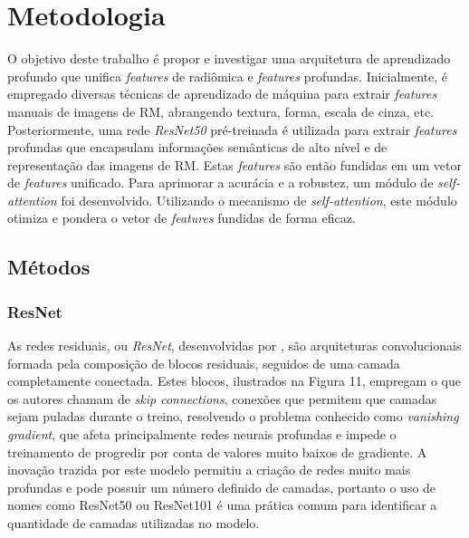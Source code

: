 \chapter{Metodologia} 
\label{chap:metodologia}

O objetivo deste trabalho é propor e investigar uma arquitetura de aprendizado profundo que unifica \textit{features} de radiômica e \textit{features} profundas. Inicialmente, é empregado diversas técnicas de aprendizado de máquina para extrair \textit{features} manuais de imagens de RM, abrangendo textura, forma, escala de cinza, etc. Posteriormente, uma rede \textit{ResNet50} pré-treinada é utilizada para extrair \textit{features} profundas que encapsulam informações semânticas de alto nível e de representação das imagens de RM. Estas \textit{features} são então fundidas em um vetor de \textit{features} unificado. Para aprimorar a acurácia e a robustez, um módulo de \textit{self-attention} foi desenvolvido. Utilizando o mecanismo de \textit{self-attention}, este módulo otimiza e pondera o vetor de \textit{features} fundidas de forma eficaz.

\section{Métodos}
\label{sec:cap4_metodos}

\subsection{ResNet}
\label{subsec:cap4_resnet}
As redes residuais, ou \textit{ResNet}, desenvolvidas por \cite{heDeepResidualLearning2015}, são arquiteturas convolucionais formada pela composição de blocos residuais, seguidos de uma camada completamente conectada. Estes blocos, ilustrados na Figura 11, empregam o que os autores chamam de \textit{skip connections}, conexões que permitem que camadas sejam puladas durante o treino, resolvendo o problema conhecido como \textit{vanishing gradient}, que afeta principalmente redes neurais profundas e impede o treinamento de progredir por conta de valores muito baixos de gradiente. A inovação trazida por este modelo permitiu a criação de redes muito mais profundas e pode possuir um número definido de camadas, portanto o uso de nomes como ResNet50 ou ResNet101 é uma prática comum para identificar a quantidade de camadas utilizadas no modelo.

